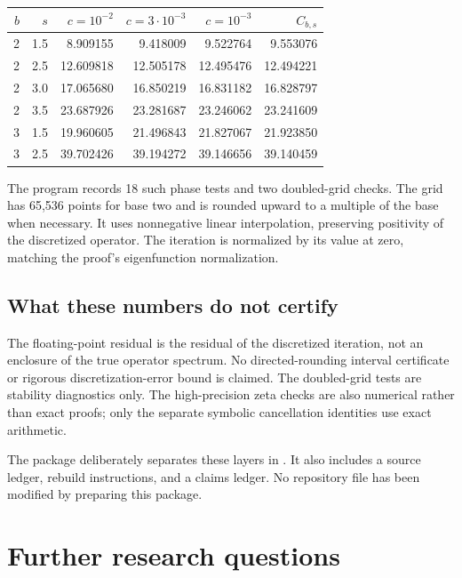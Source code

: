 \documentclass[11pt,a4paper]{article}
\numberwithin{equation}{section}
\theoremstyle{definition}
\theoremstyle{remark}
\newcommand{\code}[1]{\texttt{\detokenize{#1}}}
\begin{document}
\begin{center}
\begin{tabular}{@{}rrrrrr@{}}
\toprule
$b$ & $s$ & $c=10^{-2}$ & $c=3\cdot10^{-3}$ & $c=10^{-3}$ & $C_{b,s}$\\
\midrule
2 & 1.5 & 8.909155 & 9.418009 & 9.522764 & 9.553076\\
2 & 2.5 & 12.609818 & 12.505178 & 12.495476 & 12.494221\\
2 & 3.0 & 17.065680 & 16.850219 & 16.831182 & 16.828797\\
2 & 3.5 & 23.687926 & 23.281687 & 23.246062 & 23.241609\\
3 & 1.5 & 19.960605 & 21.496843 & 21.827067 & 21.923850\\
3 & 2.5 & 39.702426 & 39.194272 & 39.146656 & 39.140459\\
\bottomrule
\end{tabular}
\end{center}

The program records 18 such phase tests and two doubled-grid checks.
The grid has 65,536 points for base two and is rounded upward to a
multiple of the base when necessary. It uses nonnegative linear
interpolation, preserving positivity of the discretized operator.
The iteration is normalized by its value at zero, matching the proof's
eigenfunction normalization.

\subsection{What these numbers do not certify}
The floating-point residual is the residual of the discretized iteration,
not an enclosure of the true operator spectrum. No directed-rounding
interval certificate or rigorous discretization-error bound is claimed.
The doubled-grid tests are stability diagnostics only. The high-precision
zeta checks are also numerical rather than exact proofs; only the
separate symbolic cancellation identities use exact arithmetic.

The package deliberately separates these layers in
\code{results/verification.json}. It also includes a source ledger,
rebuild instructions, and a claims ledger. No repository file has been
modified by preparing this package.

\section{Further research questions}
\label{sec:questions}
\end{document}
